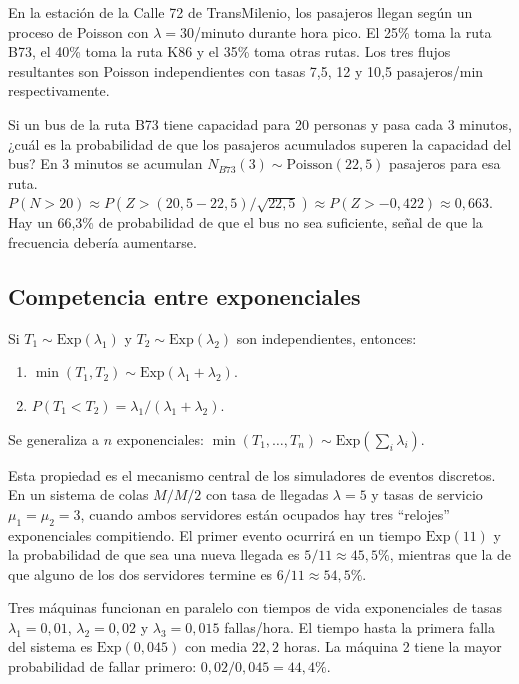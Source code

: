\documentclass[11pt, letterpaper]{article}
\begin{document}
\begin{ejemplo}
En la estación de la Calle 72 de TransMilenio, los pasajeros llegan según un proceso de Poisson con $\lambda = 30$/minuto durante hora pico. El 25\% toma la ruta B73, el 40\% toma la ruta K86 y el 35\% toma otras rutas. Los tres flujos resultantes son Poisson independientes con tasas 7{,}5, 12 y 10{,}5 pasajeros/min respectivamente.

Si un bus de la ruta B73 tiene capacidad para 20 personas y pasa cada 3 minutos, ¿cuál es la probabilidad de que los pasajeros acumulados superen la capacidad del bus? En 3 minutos se acumulan $N_{B73}(3) \sim \text{Poisson}(22{,}5)$ pasajeros para esa ruta. $P(N > 20) \approx P(Z > (20{,}5 - 22{,}5)/\sqrt{22{,}5}) \approx P(Z > -0{,}422) \approx 0{,}663$. Hay un 66{,}3\% de probabilidad de que el bus no sea suficiente, señal de que la frecuencia debería aumentarse.
\end{ejemplo}


\subsection{Competencia entre exponenciales}

\begin{teorema}
Si $T_1 \sim \text{Exp}(\lambda_1)$ y $T_2 \sim \text{Exp}(\lambda_2)$ son independientes, entonces:
\begin{enumerate}[label=(\roman*)]
    \item $\min(T_1, T_2) \sim \text{Exp}(\lambda_1 + \lambda_2)$.
    \item $P(T_1 < T_2) = \lambda_1/(\lambda_1 + \lambda_2)$.
\end{enumerate}
Se generaliza a $n$ exponenciales: $\min(T_1, \ldots, T_n) \sim \text{Exp}(\sum_i \lambda_i)$.
\end{teorema}

Esta propiedad es el mecanismo central de los simuladores de eventos discretos. En un sistema de colas $M/M/2$ con tasa de llegadas $\lambda = 5$ y tasas de servicio $\mu_1 = \mu_2 = 3$, cuando ambos servidores están ocupados hay tres ``relojes'' exponenciales compitiendo. El primer evento ocurrirá en un tiempo $\text{Exp}(11)$ y la probabilidad de que sea una nueva llegada es $5/11 \approx 45{,}5\%$, mientras que la de que alguno de los dos servidores termine es $6/11 \approx 54{,}5\%$.

\begin{ejemplo}
Tres máquinas funcionan en paralelo con tiempos de vida exponenciales de tasas $\lambda_1 = 0{,}01$, $\lambda_2 = 0{,}02$ y $\lambda_3 = 0{,}015$ fallas/hora. El tiempo hasta la primera falla del sistema es $\text{Exp}(0{,}045)$ con media $22{,}2$ horas. La máquina 2 tiene la mayor probabilidad de fallar primero: $0{,}02/0{,}045 = 44{,}4\%$.
\end{ejemplo}
\end{document}
